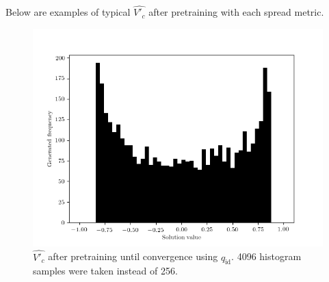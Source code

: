 \documentclass[../../main.tex]{subfiles}
\begin{document}
Below are examples of typical $\hat{V'_c}$ after pretraining with each spread metric.
\begin{figure}[H]
    \begin{center}
    \includegraphics[width=\textwidth]{identitySpread}
    \caption{
        $\hat{V'_c}$ after pretraining until convergence using $q_\text{id}$.
        4096 histogram samples were taken instead of 256.
    }
    \label{fig:identitySpread}
    \end{center}
\end{figure}
\end{document}
